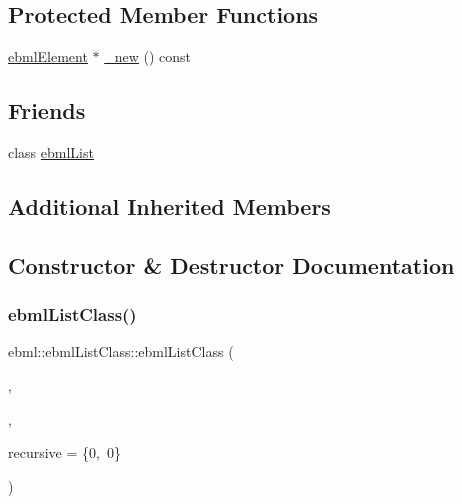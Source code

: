 \subsection*{Protected Member Functions}
\begin{DoxyCompactItemize}
\item 
\mbox{\hyperlink{classebml_1_1ebmlElement}{ebml\+Element}} $\ast$ \mbox{\hyperlink{classebml_1_1ebmlListClass_aef729ee70f218de1013c3782c481bffb}{\+\_\+new}} () const
\end{DoxyCompactItemize}
\subsection*{Friends}
\begin{DoxyCompactItemize}
\item 
class \mbox{\hyperlink{classebml_1_1ebmlListClass_af371b14231393d2eef62cb562cdd6e2d}{ebml\+List}}
\end{DoxyCompactItemize}
\subsection*{Additional Inherited Members}


\subsection{Constructor \& Destructor Documentation}
\mbox{\label{classebml_1_1ebmlListClass_a1ed01342e437e0f0623227332daca196}} 
\subsubsection{\texorpdfstring{ebml\+List\+Class()}{ebmlListClass()}\hspace{0.1cm}{\footnotesize\ttfamily [1/6]}}
{\footnotesize\ttfamily ebml\+::ebml\+List\+Class\+::ebml\+List\+Class (\begin{DoxyParamCaption}\item[{const char $\ast$}]{,  }\item[{std\+::wstring}]{,  }\item[{const \mbox{\hyperlink{structebml_1_1occurSpec__t}{occur\+Spec\+\_\+t}} \&}]{recursive = {\ttfamily \{0,~0\}} }\end{DoxyParamCaption})}

